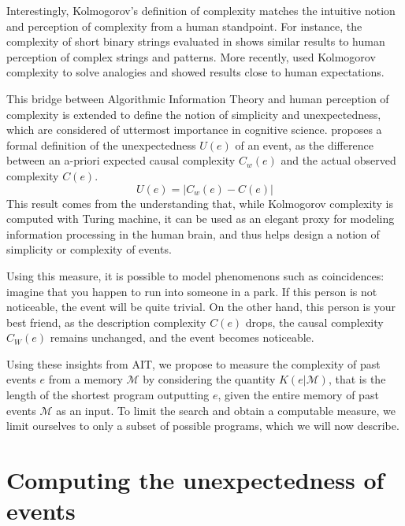 \documentclass[conference]{IEEEtran}
\begin{document}
Interestingly, Kolmogorov's definition of complexity matches the intuitive
notion and perception of complexity from a human standpoint. For instance, the
complexity of short binary strings evaluated in \cite{delahaye_numerical_2012}
shows similar results to human perception of complex strings and patterns. More
recently, \cite{murena_solving_2020} used Kolmogorov complexity to solve
analogies and showed results close to human expectations.

This bridge between Algorithmic Information Theory and human perception of
complexity is extended to define the notion of simplicity and unexpectedness,
which are considered of uttermost importance in cognitive science\cite
{chater_simplicity_2003}.
\cite{dessalles2011coincidences} proposes a formal definition of the
 unexpectedness $U(e)$ of an event, as the difference between an a-priori
 expected causal complexity $C_{w}(e)$ and the actual observed complexity $C
 (e)$.
\begin{equation}
  \label{eq:unexpected}
  U(e) = |C_{w}(e) - C(e)|
\end{equation}
This result comes from the understanding that, while Kolmogorov complexity is
computed with Turing machine, it can be used as an elegant proxy for modeling
information processing in the human brain, and thus helps design a notion of
simplicity or complexity of events.

Using this measure, it is possible to model phenomenons such as coincidences:
imagine that you happen to run into someone in a park. If this person is not
noticeable, the event will be quite trivial. On the other hand, this person is
your best friend, as the description complexity $C(e)$ drops, the causal
complexity $C_{W}(e)$ remains unchanged, and the event becomes noticeable.

Using these insights from AIT, we propose to measure the complexity of past
events $e$ from a memory $\mathcal{M}$ by considering the quantity
$K(e|\mathcal{M})$, that is the length of the shortest program outputting $e$,
given the entire memory of past events $\mathcal{M}$ as an input. To limit the
search and obtain a computable measure, we limit ourselves to only a subset of
possible programs, which we will now describe.

\section{Computing the unexpectedness of events}
\label{sec:computing}
\end{document}
